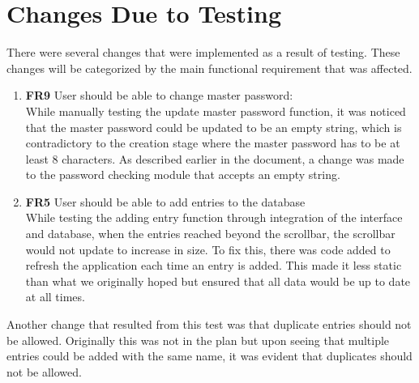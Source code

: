 \documentclass[12pt, titlepage]{article}
\begin{document}
\section{Changes Due to Testing}
	
	There were several changes that were implemented as a result of testing. These changes will be categorized by the main functional requirement that was affected.
	
	\begin{enumerate}

		\item \textbf{FR9} User should be able to change master password:\\
		While manually testing the update master password function, it was noticed that the master password could be updated to be an empty string, which is contradictory to the creation stage where the master password has to be at least 8 characters. As described earlier in the document, a change was made to the password checking module that accepts an empty string.
	
		\item \textbf{FR5} User should be able to add entries to the database\\
		While testing the adding entry function through integration of the interface and database, when the entries reached beyond the scrollbar, the scrollbar would not update to increase in size. To fix this, there was code added to refresh the application each time an entry is added. This made it less static than what we originally hoped but ensured that all data would be up to date at all times.

	\end{enumerate}

	\noindent
	Another change that resulted from this test was that duplicate entries should not be allowed. Originally this was not in the plan but upon seeing that multiple entries could be added with the same name, it was evident that duplicates should not be allowed.
	
\end{document}
